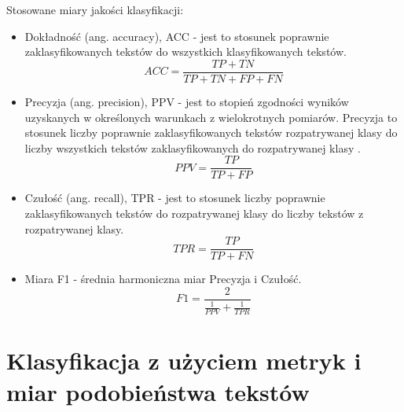 \documentclass{classrep}
\begin{document}
\ \\ \\ 
Stosowane miary jakości klasyfikacji:\\
\begin{itemize}
  \item Dokładność (ang. accuracy), ACC  - jest to stosunek poprawnie zaklasyfikowanych tekstów do wszystkich klasyfikowanych tekstów.
 \begin{equation}ACC = \frac{TP + TN}{TP + TN + FP + FN} \end{equation}
 \item Precyzja (ang. precision), PPV  - jest to stopień zgodności wyników uzyskanych w określonych warunkach z wielokrotnych pomiarów. Precyzja to stosunek liczby poprawnie zaklasyfikowanych tekstów rozpatrywanej klasy do liczby wszystkich tekstów zaklasyfikowanych do rozpatrywanej klasy . 
 \begin{equation} PPV =  \frac{TP} {TP+FP} \end{equation}
\item Czułość (ang. recall), TPR  - jest to stosunek liczby poprawnie zaklasyfikowanych tekstów do rozpatrywanej klasy do liczby tekstów z rozpatrywanej klasy. 
 \begin{equation}   TPR = \frac{TP}{TP + FN} \end{equation}
\item Miara F1 - średnia harmoniczna miar Precyzja i Czułość. 
\begin{equation}   F1 = \frac{2}{\frac{1}{PPV} + \frac{1}{TPR}} \end{equation}
\end{itemize}


\section{Klasyfikacja z użyciem metryk i miar podobieństwa tekstów}
\end{document}
